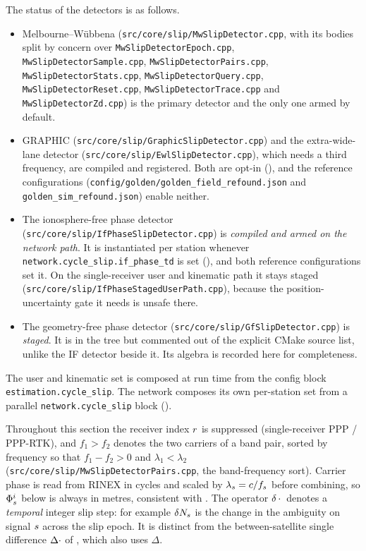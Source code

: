 \documentclass[main.tex]{subfiles}
\begin{document}
The status of the detectors is as follows.
\begin{itemize}[leftmargin=*]
\item Melbourne--W\"ubbena (\texttt{src/core/slip/MwSlipDetector.cpp},
      with its bodies split by concern over \texttt{MwSlipDetectorEpoch.cpp},
      \texttt{MwSlipDetectorSample.cpp}, \texttt{MwSlipDetectorPairs.cpp},
      \texttt{MwSlipDetectorStats.cpp}, \texttt{MwSlipDetectorQuery.cpp},
      \texttt{MwSlipDetectorReset.cpp}, \texttt{MwSlipDetectorTrace.cpp} and
      \texttt{MwSlipDetectorZd.cpp}) is
      the primary detector and the only one armed by default.
\item GRAPHIC (\texttt{src/core/slip/GraphicSlipDetector.cpp}) and the
      extra-wide-lane detector
      (\texttt{src/core/slip/EwlSlipDetector.cpp}), which needs a third
      frequency, are compiled and registered.  Both are opt-in
      (), and the reference configurations
      (\texttt{config/golden/golden\_field\_refound.json} and
      \texttt{golden\_sim\_refound.json}) enable neither.
\item The ionosphere-free phase detector
      (\texttt{src/core/slip/IfPhaseSlipDetector.cpp}) is \emph{compiled
      and armed on the network path}.  It is instantiated per station
      whenever \texttt{network.cycle\_slip.if\_phase\_td} is set
      (), and both reference configurations set it.  On
      the single-receiver user and kinematic path it stays staged
      (\texttt{src/core/slip/IfPhaseStagedUserPath.cpp}), because the
      position-uncertainty gate it needs is unsafe there.
\item The geometry-free phase detector
      (\texttt{src/core/slip/GfSlipDetector.cpp}) is \emph{staged}.  It
      is in the tree but commented out of the explicit CMake source
      list, unlike the IF detector beside it.  Its algebra is recorded
      here for completeness.
\end{itemize}
The user and kinematic set is composed at run time from the config block
\texttt{estimation.cycle\_slip}.  The network composes its own
per-station set from a parallel \texttt{network.cycle\_slip} block
().

Throughout this section the receiver index $r$ is suppressed
(single-receiver PPP / PPP-RTK), and $f_1 > f_2$ denotes the two
carriers of a band pair, sorted by frequency so that $f_1 - f_2 > 0$
and $\lambda_1 < \lambda_2$
(\texttt{src/core/slip/MwSlipDetectorPairs.cpp}, the band-frequency sort).
Carrier phase is read from RINEX in cycles and scaled by
$\lambda_s = c / f_s$ before combining, so
$\Phi^i_s$ below is always in metres, consistent with
.  The operator
$\delta \,\cdot\,$ denotes a \emph{temporal} integer slip step: for
example $\delta N_s$ is the change in the ambiguity on signal
$s$ across the slip epoch.  It is distinct from the
between-satellite single difference $\Delta \cdot$ of
,
which also uses $\Delta$.
\end{document}
